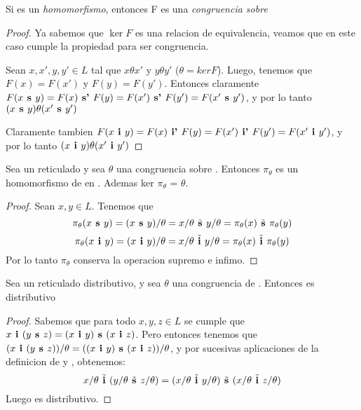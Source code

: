\begin{lemma}
  Si  es un \emph{homomorfismo}, entonces F es una \emph{congruencia sobre} \reticulAlg
\end{lemma}
\begin{proof}
  Ya sabemos que $\ker F$ es una relacion de equivalencia, veamos que en este caso cumple la propiedad para ser congruencia.

  Sean $x, x', y, y' \in L$ tal que $x\theta x'$ y $y\theta y'$ ($\theta = ker F$). Luego, tenemos que $F(x) = F(x')$ y $F(y) = F(y')$.
  Entonces claramente $F(x\textbf{ s }y) = F(x) \textbf{ s' } F(y) = F(x') \textbf{ s' } F(y') = F(x'\textbf{ s }y')$, y por lo tanto 
  $(x\textbf{ s }y)\theta(x'\textbf{ s }y')$
  
  Claramente tambien $F(x\textbf{ i }y) = F(x) \textbf{ i' } F(y) = F(x') \textbf{ i' } F(y') = F(x'\textbf{ i }y')$, y por lo tanto $(x\textbf{ i }y)\theta(x'\textbf{ i }y')$
\end{proof}

\begin{lemma}
  Sea \reticulAlg un reticulado y sea $\theta$ una congruencia sobre \reticulAlg. Entonces $\pi_\theta$ es un 
  homomorfismo de \reticulAlg en .
  Ademas ker $\pi_\theta$ = $\theta$.
\end{lemma}
\begin{proof}
  Sean $x, y \in L$. Tenemos que
  $$
  \pi_\theta(x\textbf{ s }y) = (x\textbf{ s }y)/\theta = x/\theta \tilde{\textbf{ s }} y/\theta = \pi_\theta(x) \tilde{\textbf{ s }} \pi_\theta(y)
  $$
  $$
  \pi_\theta(x\textbf{ i }y) = (x\textbf{ i }y)/\theta = x/\theta \tilde{\textbf{ i }} y/\theta = \pi_\theta(x) \tilde{\textbf{ i }} \pi_\theta(y)
  $$
  Por lo tanto $\pi_\theta$ conserva la operacion supremo e infimo.

\end{proof}

\begin{remark}
  Sea \reticulAlg un reticulado distributivo, y sea $\theta$ una congruencia de \reticulAlg. Entonces 
  es distributivo
\end{remark}
\begin{proof}
  Sabemos que para todo $x,y,z \in L$ se cumple que $x\textbf{ i }(y\textbf{ s }z) = (x\textbf{ i }y)\textbf{ s }(x\textbf{ i }z)$.
  Pero entonces tenemos que $(x\textbf{ i }(y\textbf{ s }z))/\theta = ((x\textbf{ i }y)\textbf{ s }(x\textbf{ i }z))/\theta$, y por sucesivas aplicaciones de la definicion de \supbincongr{}{} y \infbincongr{}{}, obtenemos:
  $$
  x/\theta\tilde{\textbf{ i }}(y/\theta\tilde{\textbf{ s }}z/\theta) = (x/\theta\tilde{\textbf{ i }}y/\theta)\tilde{\textbf{ s }}(x/\theta\tilde{\textbf{ i }}z/\theta)
  $$
  Luego  es distributivo.
\end{proof}
